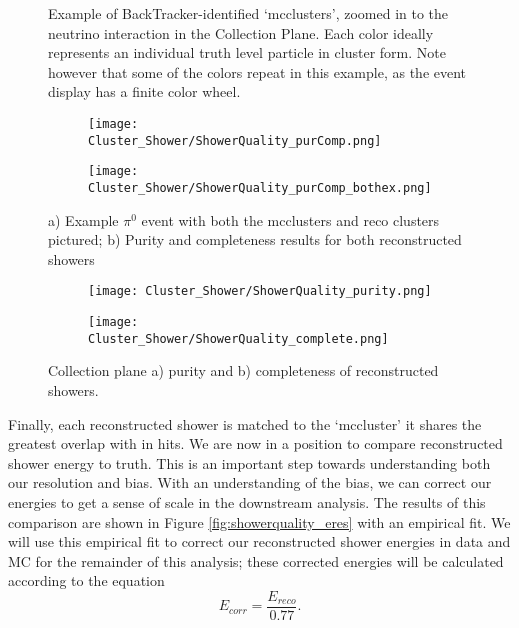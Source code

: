 \begin{figure}[h!]
\centering
{}
\caption{ Example of BackTracker-identified `mcclusters', zoomed in to the neutrino interaction in the Collection Plane. Each color ideally represents an individual truth level particle in cluster form. Note however that some of the colors repeat in this example, as the event display has a finite color wheel. }
\label{fig:mcclusters}
\end{figure}

\begin{figure}[t!]
\centering
  \begin{subfigure}[t]{0.4\textwidth}
    \centering
\texttt{[image: Cluster\_Shower/ShowerQuality\_purComp.png]}
  \caption{ }
  \end{subfigure} 
  \hspace{5mm}
  \begin{subfigure}[t]{0.45\textwidth}
    \centering
\texttt{[image: Cluster\_Shower/ShowerQuality\_purComp\_bothex.png]}
  \caption{ }
  \end{subfigure} 
\caption{a) Example $\pi^0$ event with both the mcclusters and reco clusters pictured; b) Purity and completeness results for both reconstructed showers }
\label{fig:showerquality_purcompex}
\end{figure}


\begin{figure}[t!]
\centering
  \begin{subfigure}[t]{0.45\textwidth}
    \centering
\texttt{[image: Cluster\_Shower/ShowerQuality\_purity.png]}
  \caption{ }
  \end{subfigure} 
  \hspace{3mm}
  \begin{subfigure}[t]{0.45\textwidth}
    \centering
\texttt{[image: Cluster\_Shower/ShowerQuality\_complete.png]}
  \caption{ }
  \end{subfigure} 
\caption{Collection plane a) purity and b) completeness of reconstructed showers. }
\label{fig:showerquality_purcomp}
\end{figure}

\par  Finally, each reconstructed shower is matched to the `mccluster' it shares the greatest overlap with in hits. We are now in a position to compare reconstructed shower energy to truth. This is an important step towards understanding both our resolution and bias. With an understanding of the bias, we can correct our energies to get a sense of scale in the downstream analysis. The results of this comparison are shown in Figure \ref{fig:showerquality_eres} with an empirical fit. We will use this empirical fit to correct our reconstructed shower energies in data and MC for the remainder of this analysis; these corrected energies will be calculated according to the equation
\begin{equation}
\label{eq:ecorr}
E_{corr} = \frac{E_{reco}}{0.77} .
\end{equation}

